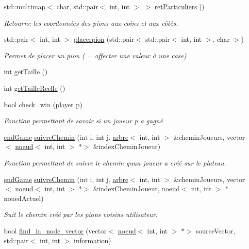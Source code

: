 \begin{DoxyCompactItemize}
std\+::multimap$<$ char, std\+::pair$<$ int, int $>$ $>$ \hyperlink{classplateau_ae3ef298374f71fb9bcdcf7c878ba9be8}{ret\+Particuliers} ()
\begin{DoxyCompactList}\small\item\em Retourne les coordonnées des pions aux coins et aux côtés. \end{DoxyCompactList}\item 
std\+::pair$<$ int, int $>$ \hyperlink{classplateau_ab7e3c4e4727aed1b116a2f472ee98fc5}{placerpion} (std\+::pair$<$ std\+::pair$<$ int, int $>$, char $>$)
\begin{DoxyCompactList}\small\item\em Permet de placer un pion ( = affecter une valeur à une case) \end{DoxyCompactList}\item 
int \hyperlink{classplateau_a125f7eafbef231cef7db62eb5e2ab94b}{get\+Taille} ()
\item 
int \hyperlink{classplateau_a45e938ee9402b3d7a0b6eeb4b08557f7}{get\+Taille\+Reelle} ()
\item 
bool \hyperlink{classplateau_a064f80a5451965f1efbe982ff9fc6366}{check\+\_\+win} (\hyperlink{classplayer}{player} p)
\begin{DoxyCompactList}\small\item\em Fonction permettant de savoir si un joueur \textquotesingle{}p\textquotesingle{} a gagné \end{DoxyCompactList}\item 
\hyperlink{classplateau_a94b54e0a84c850657a83176f812db222}{end\+Game} \hyperlink{classplateau_accb292e7cf7ffd0df0fe4cec587ed5f7}{suivre\+Chemin} (int i, int j, \hyperlink{classarbre}{arbre}$<$ int, int $>$ \&chemin\+Joueurs, vector$<$ \hyperlink{classnoeud}{noeud}$<$ int, int $>$ $\ast$$>$ \&index\+Chemin\+Joueur)
\begin{DoxyCompactList}\small\item\em Fonction permettant de suivre le chemin qu\textquotesingle{}un joueur a créé sur le plateau. \end{DoxyCompactList}\item 
\hyperlink{classplateau_a94b54e0a84c850657a83176f812db222}{end\+Game} \hyperlink{classplateau_a1128f1aaf7cb50cabec306d3171858b5}{suivre\+Chemin} (int i, int j, \hyperlink{classarbre}{arbre}$<$ int, int $>$ \&chemin\+Joueurs, vector$<$ \hyperlink{classnoeud}{noeud}$<$ int, int $>$ $\ast$$>$ \&index\+Chemin\+Joueur, \hyperlink{classnoeud}{noeud}$<$ int, int $>$ $\ast$noued\+Actuel)
\begin{DoxyCompactList}\small\item\em Suit le chemin créé par les pions voisins utilisateur. \end{DoxyCompactList}\item 
bool \hyperlink{classplateau_a9b9989e2096354655caf666fdc267dc1}{find\+\_\+in\+\_\+node\+\_\+vector} (vector$<$ \hyperlink{classnoeud}{noeud}$<$ int, int $>$ $\ast$$>$ source\+Vector, std\+::pair$<$ int, int $>$ information)
\end{DoxyCompactItemize}
